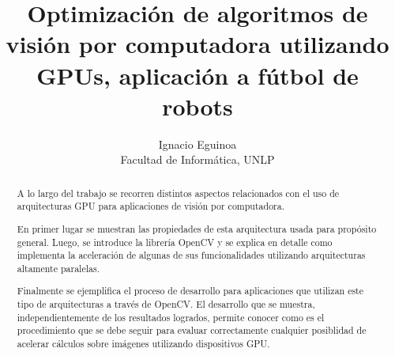 \documentclass[a4paper,10pt]{report}
\title{Optimización de algoritmos de visión por computadora utilizando GPUs, aplicación a fútbol de robots}
\author{Ignacio Eguinoa \\
\small Facultad de Informática, UNLP}
\date{}
\begin{document}
\maketitle


\begin{abstract}





A lo largo del trabajo se recorren distintos aspectos relacionados con el uso de arquitecturas GPU para aplicaciones de visión por computadora. 

En primer lugar se muestran las propiedades de esta arquitectura usada para propósito general. 
Luego, se introduce la librería OpenCV y se explica en detalle como implementa la aceleración de algunas de sus funcionalidades utilizando arquitecturas altamente paralelas. 

Finalmente se ejemplifica el proceso de desarrollo para aplicaciones que utilizan este tipo de arquitecturas a través de OpenCV. 
El desarrollo que se muestra, independientemente de los resultados logrados, permite conocer como es el procedimiento que se debe seguir para evaluar correctamente cualquier posiblidad de acelerar cálculos sobre imágenes utilizando dispositivos GPU.

\end{abstract}


\tableofcontents
\end{document}
